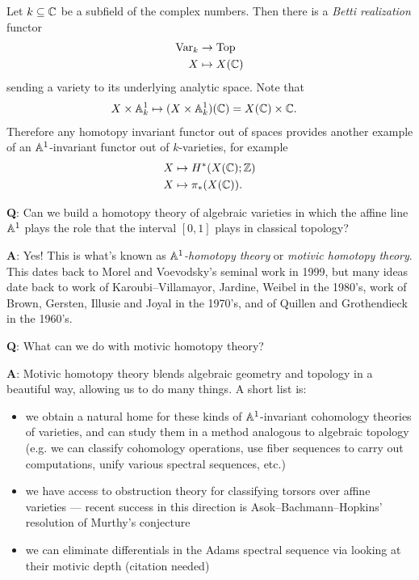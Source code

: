 \documentclass[11pt,openany]{book}
\begin{document}
\begin{example} Let $k \subseteq \mathbb{C}$ be a subfield of the complex numbers. Then there is a \textit{Betti realization} functor
\begin{align*}
    \mathrm{Var}_k &\to \mathrm{Top} \\
    X &\mapsto X(\mathbb{C})
\end{align*}
sending a variety to its underlying analytic space. Note that
\begin{align*}
    X \times \mathbb{A}^1_k &\mapsto (X \times \mathbb{A}^1_k)(\mathbb{C}) = X(\mathbb{C}) \times \mathbb{C}.
\end{align*}
Therefore any homotopy invariant functor out of spaces provides another example of an $\mathbb{A}^1$-invariant functor out of $k$-varieties, for example
\begin{align*}
    X &\mapsto H^\ast(X(\mathbb{C});\mathbb{Z}) \\
    X &\mapsto \pi_\ast (X(\mathbb{C})).
\end{align*}
\end{example}


\textbf{Q}: Can we build a homotopy theory of algebraic varieties in which the affine line $\mathbb{A}^1$ plays the role that the interval $[0,1]$ plays in classical topology?

\textbf{A}: Yes! This is what's known as \textit{$\mathbb{A}^1$-homotopy theory} or \textit{motivic homotopy theory}. This dates back to Morel and Voevodsky's seminal work in 1999, but many ideas date back to work of Karoubi--Villamayor, Jardine, Weibel in the 1980's, work of Brown, Gersten, Illusie and Joyal in the 1970's, and of Quillen and Grothendieck in the 1960's.

\textbf{Q}: What can we do with motivic homotopy theory?

\textbf{A}: Motivic homotopy theory blends algebraic geometry and topology in a beautiful way, allowing us to do many things. A short list is:
\begin{itemize}
    \item we obtain a natural home for these kinds of $\mathbb{A}^1$-invariant cohomology theories of varieties, and can study them in a method analogous to algebraic topology (e.g. we can classify cohomology operations, use fiber sequences to carry out computations, unify various spectral sequences, etc.)
    \item we have access to obstruction theory for classifying torsors over affine varieties --- recent success in this direction is Asok--Bachmann--Hopkins' resolution of Murthy's conjecture
    \item we can eliminate differentials in the Adams spectral sequence via looking at their motivic depth (citation needed)
\end{itemize}
\end{document}

